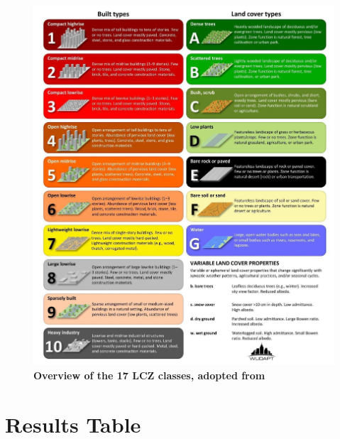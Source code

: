 \documentclass[final,3p,times,authoryear]{elsarticle}
\begin{document}
\begin{figure}
\centering
\includegraphics[trim={0 0 0 0},clip,scale=0.25]{images/image10.jpg}
\caption{\bf Overview of the 17 LCZ classes, adopted from \cite{Demuzere2022}}
 \label{fig:17lczs}
\end{figure}

\section{Results Table}\label{sec:appendix2}







\end{document}
